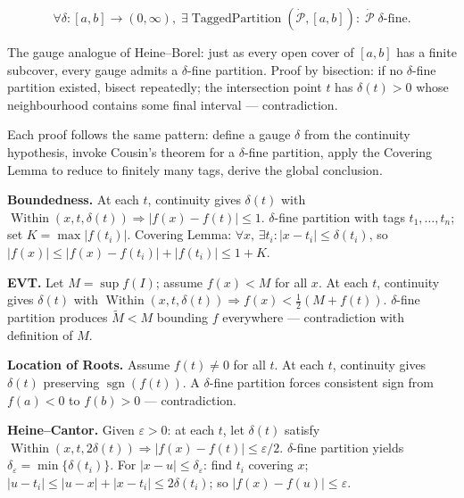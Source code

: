 \begin{remark*}
\[
  \forall\delta:[a,b]\to(0,\infty),\;
  \exists\operatorname{TaggedPartition}(\dot{\mathcal{P}},[a,b]):\;
  \dot{\mathcal{P}}\;\delta\text{-fine}.
\]
\end{remark*}

\begin{remark*}[Interpretation]
The gauge analogue of Heine--Borel: just as every open cover of
$[a,b]$ has a finite subcover, every gauge admits a $\delta$-fine
partition. Proof by bisection: if no $\delta$-fine partition existed,
bisect repeatedly; the intersection point $t$ has $\delta(t)>0$
whose neighbourhood contains some final interval —
contradiction.
\end{remark*}


\begin{remark*}
Each proof follows the same pattern: define a gauge $\delta$ from
the continuity hypothesis, invoke Cousin's theorem for a $\delta$-fine
partition, apply the Covering Lemma to reduce to finitely many tags,
derive the global conclusion.

\medskip
\textbf{Boundedness.} At each $t$, continuity gives $\delta(t)$ with
$\operatorname{Within}(x,t,\delta(t))\Rightarrow|f(x)-f(t)|\leq 1$.
$\delta$-fine partition with tags $t_1,\ldots,t_n$; set $K=\max|f(t_i)|$.
Covering Lemma: $\forall x,\,\exists t_i:|x-t_i|\leq\delta(t_i)$, so
$|f(x)|\leq|f(x)-f(t_i)|+|f(t_i)|\leq 1+K$.

\medskip
\textbf{EVT.} Let $M=\sup f(I)$; assume $f(x)<M$ for all $x$. At
each $t$, continuity gives $\delta(t)$ with
$\operatorname{Within}(x,t,\delta(t))\Rightarrow f(x)<\tfrac{1}{2}(M+f(t))$.
$\delta$-fine partition produces $\widetilde{M}<M$ bounding $f$
everywhere — contradiction with definition of $M$.

\medskip
\textbf{Location of Roots.} Assume $f(t)\neq 0$ for all $t$. At
each $t$, continuity gives $\delta(t)$ preserving
$\operatorname{sgn}(f(t))$. A $\delta$-fine partition forces
consistent sign from $f(a)<0$ to $f(b)>0$ — contradiction.

\medskip
\textbf{Heine--Cantor.} Given $\varepsilon>0$: at each $t$, let
$\delta(t)$ satisfy $\operatorname{Within}(x,t,2\delta(t))
\Rightarrow|f(x)-f(t)|\leq\varepsilon/2$. $\delta$-fine partition
yields $\delta_\varepsilon=\min\{\delta(t_i)\}$. For
$|x-u|\leq\delta_\varepsilon$: find $t_i$ covering $x$;
$|u-t_i|\leq|u-x|+|x-t_i|\leq 2\delta(t_i)$; so
$|f(x)-f(u)|\leq\varepsilon$.
\end{remark*}
